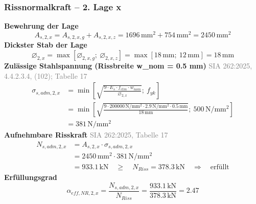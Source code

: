 \documentclass[11pt,a4paper]{article}
\newcommand{\normref}[1]{{\small\textcolor{gray}{#1}}}
\begin{document}
\subsubsection{Rissnormalkraft – 2. Lage x}
\noindent\textbf{Bewehrung der Lage}
\begin{equation*}
A_{s,2,x} = A_{s,2,x,g} + A_{s,2,x,z} = 1696\,\mathrm{mm}^{2} + 754\,\mathrm{mm}^{2} = 2450\,\mathrm{mm}^{2}
\end{equation*}
\noindent\textbf{Dickster Stab der Lage}
\begin{equation*}
\varnothing_{2,x} = \max\left[\varnothing_{2,x,g};\ \varnothing_{2,x,z}\right] = \max\left[18\,\mathrm{mm};\ 12\,\mathrm{mm}\right] = 18\,\mathrm{mm}
\end{equation*}
\noindent\textbf{Zulässige Stahlspannung (Rissbreite w\_nom = 0.5 mm)} \hfill \normref{SIA 262:2025, 4.4.2.3.4, (102); Tabelle 17}
\begin{equation*}
\begin{aligned}
  \sigma_{s,adm,2,x} &= \min\left[\sqrt{\frac{9 \cdot E_s \cdot f_{ctm} \cdot w_{nom}}{\varnothing_{2,x}}};\ f_{yk}\right] \\
  &= \min\left[\sqrt{\frac{9 \cdot 200000\,\mathrm{N}/\mathrm{mm}^{2} \cdot 2.9\,\mathrm{N}/\mathrm{mm}^{2} \cdot 0.5\,\mathrm{mm}}{18\,\mathrm{mm}}};\ 500\,\mathrm{N}/\mathrm{mm}^{2}\right] \\
  &= 381\,\mathrm{N}/\mathrm{mm}^{2}
\end{aligned}
\end{equation*}
\noindent\textbf{Aufnehmbare Risskraft} \hfill \normref{SIA 262:2025, Tabelle 17}
\begin{equation*}
\begin{aligned}
  N_{s,adm,2,x} &= A_{s,2,x} \cdot \sigma_{s,adm,2,x} \\
  &= 2450\,\mathrm{mm}^{2} \cdot 381\,\mathrm{N}/\mathrm{mm}^{2} \\
  &= 933.1\,\mathrm{kN} \quad \ge \quad N_{Riss} = 378.3\,\mathrm{kN} \quad \Rightarrow \quad \text{erfüllt}
\end{aligned}
\end{equation*}
\noindent\textbf{Erfüllungsgrad}
\begin{equation*}
\alpha_{eff,NR,2,x} = \frac{N_{s,adm,2,x}}{N_{Riss}} = \frac{933.1\,\mathrm{kN}}{378.3\,\mathrm{kN}} = 2.47
\end{equation*}
\end{document}
